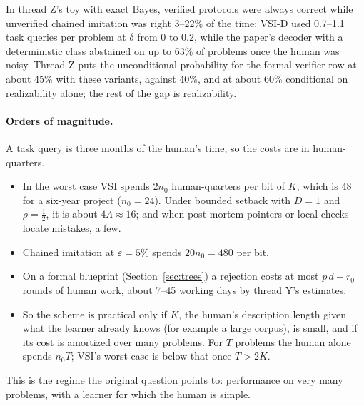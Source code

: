\documentclass[11pt]{article}
\theoremstyle{definition}
\theoremstyle{remark}
\newcommand{\K}{K}
\begin{document}
In thread Z's toy with exact Bayes, verified protocols were always correct while unverified chained imitation was right 3--22\% of the time; VSI-D used 0.7--1.1 task queries per problem at $\delta$ from 0 to 0.2, while the paper's decoder with a deterministic class abstained on up to 63\% of problems once the human was noisy. Thread Z puts the unconditional probability for the formal-verifier row at about 45\% with these variants, against 40\%, and at about 60\% conditional on realizability alone; the rest of the gap is realizability.

\paragraph{Orders of magnitude.} A task query is three months of the human's time, so the costs are in human-quarters.
\begin{itemize}[nosep]
\item In the worst case VSI spends $2n_0$ human-quarters per bit of $\K$, which is $48$ for a six-year project ($n_0=24$). Under bounded setback with $D=1$ and $\rho=\frac12$, it is about $4\Lambda\approx16$; and when post-mortem pointers or local checks locate mistakes, a few.
\item Chained imitation at $\varepsilon=5\%$ spends $20n_0=480$ per bit.
\item On a formal blueprint (Section~\ref{sec:trees}) a rejection costs at most $p\,d+r_0$ rounds of human work, about 7--45 working days by thread Y's estimates.
\item So the scheme is practical only if $\K$, the human's description length given what the learner already knows (for example a large corpus), is small, and if its cost is amortized over many problems. For $T$ problems the human alone spends $n_0T$; VSI's worst case is below that once $T>2\K$.
\end{itemize}
This is the regime the original question points to: performance on very many problems, with a learner for which the human is simple.
\end{document}
